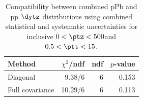 \begin{table}[htp!]
\centering
\begin{tabular}{|l|r|r|r|}
\hline
Method & $\chi^2$/ndf & ndf & $p$-value \\
\hline
Diagonal & 9.38/6 & 6 & 0.153 \\
Full covariance & 10.29/6 & 6 & 0.113 \\
\hline
\end{tabular}
\caption{Compatibility between combined pPb and pp $\dytz$ distributions using combined statistical and systematic uncertainties for inclusive $0 < \ptz < 500$\GeV and $0.5 < \ptt < 15$\GeV.}
\label{table:chisq_deta}
\end{table}
